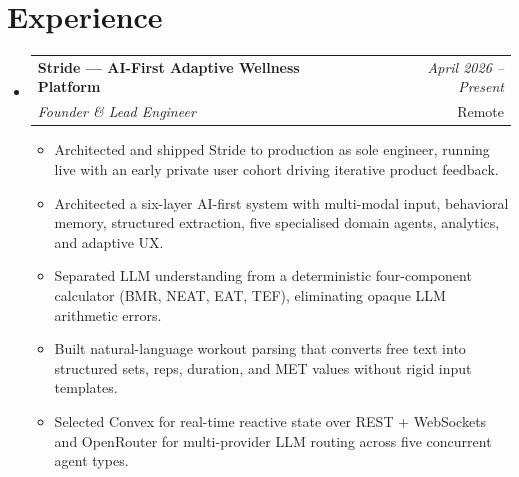\documentclass[a4paper,11pt]{article}
\makeatletter
\newcommand{\resumeSubheading}[4]{
\vspace{0.5mm}\item
    \begin{tabular*}{0.98\textwidth}[t]{l@{\extracolsep{\fill}}r}
        \textbf{#1} & \textit{\footnotesize{#4}} \\
        \textit{\footnotesize{#3}} & \footnotesize{#2}\\
    \end{tabular*}
    \vspace{-2.4mm}
}
\newcommand{\resumeSubHeadingListStart}{\begin{itemize}[leftmargin=*,labelsep=0mm]}
\newcommand{\resumeItemListStart}{\begin{justify}\begin{itemize}[leftmargin=3ex, rightmargin=2ex, noitemsep,labelsep=1.2mm,itemsep=0mm]\small}
\newcommand{\resumeSubHeadingListEnd}{\end{itemize}\vspace{2mm}}
\newcommand{\resumeItemListEnd}{\end{itemize}\end{justify}\vspace{-2mm}}
\makeatother
\begin{document}
\section{\textbf{Experience}}
\resumeSubHeadingListStart
    \resumeSubheading
      {Stride --- AI-First Adaptive Wellness Platform}{Remote}
      {Founder \& Lead Engineer}{April 2026 -- Present}
      \resumeItemListStart
        \item {Architected and shipped Stride to production as sole engineer, running live with an early private user cohort driving iterative product feedback.}
        \item {Architected a six-layer AI-first system with multi-modal input, behavioral memory, structured extraction, five specialised domain agents, analytics, and adaptive UX.}
        \item {Separated LLM understanding from a deterministic four-component calculator (BMR, NEAT, EAT, TEF), eliminating opaque LLM arithmetic errors.}
        \item {Built natural-language workout parsing that converts free text into structured sets, reps, duration, and MET values without rigid input templates.}
        \item {Selected Convex for real-time reactive state over REST + WebSockets and OpenRouter for multi-provider LLM routing across five concurrent agent types.}
      \resumeItemListEnd
\resumeSubHeadingListEnd
\vspace{-5mm}

\end{document}
